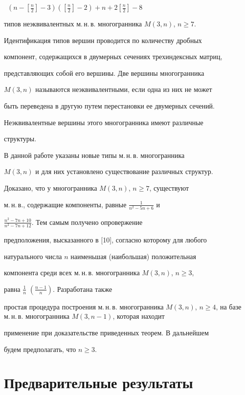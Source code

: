\ $(n-\left[\frac{n}{2}\right]-3)(\left[\frac{n}{2}\right]-2)


+n+2\left[\frac{n}{2}\right]-8$


типов неэквивалентных м.\,н.\,в. многогранника $M(3,n)$, $n\geq 7$.


Идентификация типов вершин проводится по количеству дробных


компонент, содержащихся в двумерных сечениях трехиндексных матриц,


представляющих собой его вершины. Две вершины многогранника


$M(3,n)$ называются неэквивалентными, если одна из них не может


быть переведена в другую путем перестановки ее двумерных сечений.


Неэквивалентные вершины этого многогранника имеют различные


структуры.





В данной работе указаны новые типы м.\,н.\,в. многогранника


$M(3,n)$ и для них установлено существование различных структур.


Доказано, что у многогранника $M(3,n)$, $n\geq 7$, существуют


м.\,н.\,в., содержащие компоненты, равные $\frac{1}{n^2 -5n+6}$ и


$\frac{n^2 -7n+10}{n^2 -7n+12}$. Тем самым получено опровержение


предположения, высказанного в [10], согласно которому для любого


натурального числа $n$ наименьшая (наибольшая) положительная


компонента среди всех м.\,н.\,в. многогранника $M(3,n)$, $n\geq 3$,


равна $\frac{1}{n}$ $\left(\frac{n-1}{n}\right)$. Разработана также


простая процедура построения м.\,н.\,в. многогранника $M(3,n)$, $n\geq


4$, на базе м.\,н.\,в. многогранника $M(3,n-1)$, которая находит


применение при доказательстве приведенных теорем. В дальнейшем


будем предполагать, что $n\geq 3.$








\section{Предварительные результаты}





